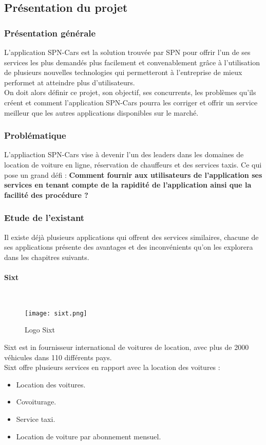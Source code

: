 \subsection{Présentation du projet}
\subsubsection{Présentation générale}
L'application SPN-Cars est la solution trouvée par SPN pour offrir l'un de ses services les plus demandés plus facilement et convenablement grâce à l'utilisation de plusieurs nouvelles technologies qui permetteront à l'entreprise de mieux performet at atteindre plus d'utilisateurs.\\
\noindent On doit alors définir ce projet, son objectif, ses concurrents, les problèmes qu'ils créent et comment l'application SPN-Cars pourra les corriger et offrir un service meilleur que les autres applications disponibles sur le marché.
\subsubsection{Problématique}
L'appliaction SPN-Cars vise à devenir l'un des leaders dans les domaines de location de voiture en ligne, réservation de chauffeurs et des services taxis. Ce qui pose un grand défi : \textbf{Comment fournir aux utilisateurs de l'application ses services en tenant compte de la rapidité de l'application ainsi que la facilité des procédure ?}
\subsubsection{Etude de l'existant}
Il existe déjà plusieurs applications qui offrent des services similaires, chacune de ses applications présente des avantages et des inconvénients qu'on les explorera dans les chapitres suivants.
\paragraph{Sixt}\mbox{} \\
\vspace{1cm}
\begin{figure}[H]
    \centering
    \texttt{[image: sixt.png]}
    \vspace{0.5cm}
    \caption{Logo Sixt}
    \label{fig:sixt_logo}
\end{figure}
\vspace{1cm}
Sixt est in fournisseur international de voitures de location, avec plus de 2000 véhicules dans 110 différents pays.\\
\noindent Sixt offre plusieurs services en rapport avec la location des voitures :
\begin{itemize}
    \item Location des voitures.
    \item Covoiturage.
    \item Service taxi.
    \item Location de voiture par abonnement mensuel.
\end{itemize}
